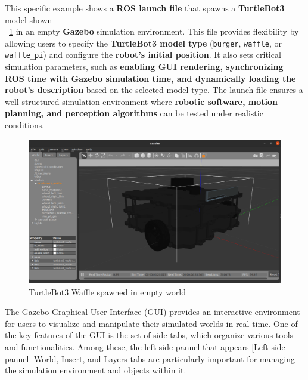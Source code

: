 \documentclass[../../main]{subfiles}
\begin{document}
This specific example shows a \textbf{ROS launch file} that spawns a \textbf{TurtleBot3} model shown\\ ~\cref{TurtleBot3 in empty world} in an empty \textbf{Gazebo} simulation environment. 
This file provides flexibility by allowing users to specify the \textbf{TurtleBot3 model type} (\texttt{burger}, \texttt{waffle}, or \texttt{waffle\_pi}) 
and configure the \textbf{robot's initial position}. It also sets critical simulation parameters, 
such as \textbf{enabling GUI rendering, synchronizing ROS time with Gazebo simulation time, 
and dynamically loading the robot’s description} based on the selected model type. 
The launch file ensures a well-structured simulation environment where \textbf{robotic software, motion planning, and perception algorithms} 
can be tested under realistic conditions. 

\begin{figure}[H]
    \centering
\includegraphics[width=\textwidth]{fig/turtlebot3_waffle.png}
\caption{TurtleBot3 Waffle spawned in empty world}
\label{TurtleBot3 in empty world} %
\end{figure}

The Gazebo Graphical User Interface (GUI) provides an interactive environment for users to visualize and manipulate their simulated worlds in real-time. 
One of the key features of the GUI is the set of side tabs, which organize various tools and functionalities. Among these, the left side pannel that appears \cref{Left side pannel} World, Insert, 
and Layers tabs are particularly important for managing the simulation environment and objects within it.
\end{document}
